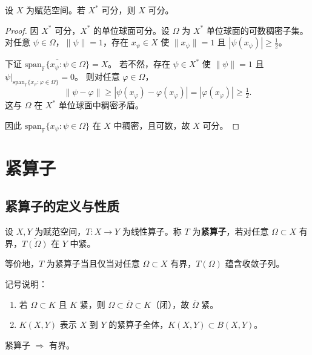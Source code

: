 \documentclass[lang=cn,a4paper,newtx,section]{elegantbook}
\begin{document}
\begin{theorem}
  设 $X$ 为赋范空间。若 $X^*$ 可分，则 $X$ 可分。
\end{theorem}

\begin{proof}
  因 $X^*$ 可分，$X^*$ 的单位球面可分。设 $\Omega$ 为 $X^*$ 单位球面的可数稠密子集。
  对任意 $\psi\in\Omega$，$\|\psi\|=1$，存在 $x_\psi\in X$ 使 $\|x_\psi\|=1$ 且 $|\psi(x_\psi)|\ge\tfrac{1}{2}$。

  下证 $\overline{\mathrm{span}_{\mathbb{F}}\{x_\psi:\psi\in\Omega\}}=X$。
  若不然，存在 $\psi\in X^*$ 使 $\|\psi\|=1$ 且 $\psi|_{\mathrm{span}_{\mathbb{F}}\{x_\varphi:\varphi\in\Omega\}}=0$。
  则对任意 $\varphi\in\Omega$，
  \[
    \|\psi-\varphi\|\ge|\psi(x_\varphi)-\varphi(x_\varphi)|=|\varphi(x_\varphi)|\ge\tfrac{1}{2}.
  \]
  这与 $\Omega$ 在 $X^*$ 单位球面中稠密矛盾。

  因此 $\mathrm{span}_{\mathbb{F}}\{x_\psi:\psi\in\Omega\}$ 在 $X$ 中稠密，且可数，故 $X$ 可分。
\end{proof}

\chapter{紧算子}

\section{紧算子的定义与性质}

\begin{definition}[紧算子]
  设 $X,Y$ 为赋范空间，$T:X\to Y$ 为线性算子。称 $T$ 为\textbf{紧算子}，若对任意 $\Omega\subset X$ 有界，$\overline{T(\Omega)}$ 在 $Y$ 中紧。
  
  等价地，$T$ 为紧算子当且仅当对任意 $\Omega\subset X$ 有界，$T(\Omega)$ 蕴含收敛子列。
\end{definition}

\begin{remark}
  记号说明：
  \begin{enumerate}
    \item 若 $\Omega\subset K$ 且 $K$ 紧，则 $\Omega\subset\overline{\Omega}\subset K$（闭），故 $\overline{\Omega}$ 紧。
    \item $K(X,Y)$ 表示 $X$ 到 $Y$ 的紧算子全体，$K(X,Y)\subset B(X,Y)$。
  \end{enumerate}
\end{remark}

\begin{proposition}
  紧算子 $\Rightarrow$ 有界。
\end{proposition}
\end{document}
